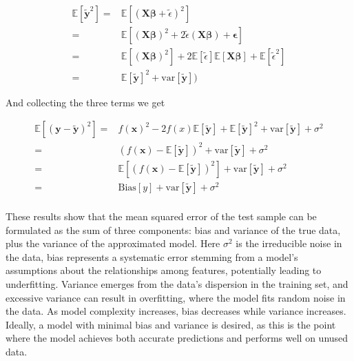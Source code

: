 \documentclass[a4paper,12pt]{article}
\begin{document}
\begin{equation} 
\begin{split}
\mathbb{E}[\boldsymbol{\tilde{y}}^2]=&\mathbb{E}[(\boldsymbol{X}\boldsymbol{\beta} + \tilde{\epsilon})^2]\\
= &\mathbb{E}[(\boldsymbol{X}\boldsymbol{\beta})^2 + 2\tilde{\epsilon}(\boldsymbol{X}\boldsymbol{\beta}) + \boldsymbol{\epsilon}]\\
= &\mathbb{E}[(\boldsymbol{X}\boldsymbol{\beta})^2] + 2\mathbb{E}[\tilde{\epsilon}]\mathbb{E}[\boldsymbol{X}\boldsymbol{\beta}] + \mathbb{E}[\tilde{\epsilon}^2]\\
=&\mathbb{E}[\boldsymbol{\tilde{y}}]^2+\mathrm{var}[\boldsymbol{\tilde{y}}])
\end{split}
\end{equation}

\noindent
And collecting the three terms we get


\begin{equation} 
\begin{split}
\mathbb{E}\left[(\boldsymbol{y}-\boldsymbol{\tilde{y}})^2\right]=&f(\boldsymbol{x})^2-2{f({x})}\mathbb{E}[\boldsymbol{\tilde{y}}]+\mathbb{E}[\boldsymbol{\tilde{y}}]^2+\mathrm{var}[\boldsymbol{\tilde{y}}]+\sigma^2\\
=&(f(\boldsymbol{x})-\mathbb{E}[\boldsymbol{\tilde{y}}])^2+\mathrm{var}[\boldsymbol{\tilde{y}}]+\sigma^2\\
=&\mathbb{E}\left[\left({f(\boldsymbol{x})}-\mathbb{E}\left[\boldsymbol{\tilde{y}}\right]\right)^2\right]+\mathrm{var}[\boldsymbol{\tilde{y}}]+\sigma^2\\
=&\mathrm{Bias}[y]+\mathrm{var}[\boldsymbol{\tilde{y}}]+\sigma^2\\
\end{split}
\end{equation}

\noindent
These results show that the mean squared error of the test sample can be formulated as the sum of three components: bias and variance of the true data, plus the variance of the approximated model. Here $\sigma^2$ is the irreducible noise in the data, bias represents a systematic error stemming from a model's assumptions about the relationships among features, potentially leading to underfitting. Variance emerges from the data's dispersion in the training set, and excessive variance can result in overfitting, where the model fits random noise in the data. As model complexity increases, bias decreases while variance increases. Ideally, a model with minimal bias and variance is desired, as this is the point where the model achieves both accurate predictions and performs well on unused data.
\end{document}
